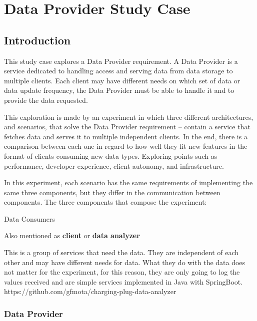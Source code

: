 \newcommand{\sla}{\textbackslash}

\newcommand{\cmd}[1]{\textsf{#1}}

\newcommand{\pkg}[1]{\textsf{#1}}

\newcommand{\ltxcmd}[1]{\cmd{\sla{}#1}}

\chapter{Data Provider Study Case}
\label{chap:dataprovider}

\section{Introduction}
\label{sec:introductionprov}

This study case explores a Data Provider requirement. A Data Provider is a service dedicated to handling access and serving data from data storage to multiple clients. Each client may have different needs on which set of data or data update frequency, the Data Provider must be able to handle it and to provide the data requested.

This exploration is made by an experiment in which three different architectures, and scenarios, that solve the Data Provider requirement – contain a service that fetches data and serves it to multiple independent clients. In the end, there is a comparison between each one in regard to how well they fit new features in the format of clients consuming new data types. Exploring points such as performance, developer experience, client autonomy, and infrastructure.

In this experiment, each scenario has the same requirements of implementing the same three components, but they differ in the communication between components. The three components that compose the experiment:

{Data Consumers}
\label{sec:dataconsumer}

Also mentioned as \textbf{client} or \textbf{data analyzer}

This is a group of services that need the data. They are independent of each other and may have different needs for data. What they do with the data does not matter for the experiment, for this reason, they are only going to log the values received and are simple services implemented in Java with SpringBoot. https://github.com/gfmota/charging-plug-data-analyzer

\subsection*{Data Provider}
\label{sec:dataprovider}

